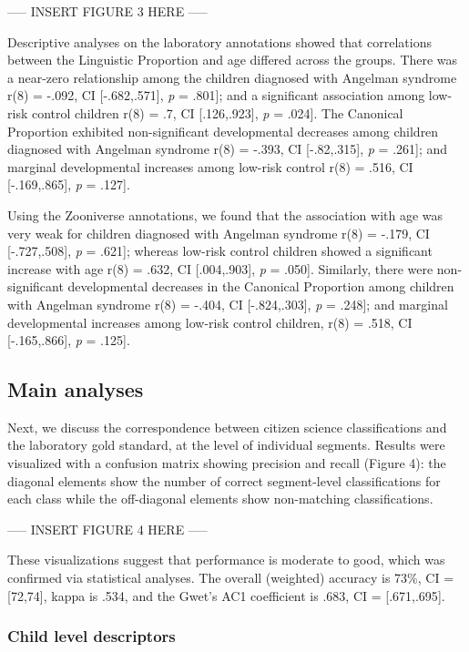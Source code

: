 \documentclass[english,,man]{apa6}
\begin{document}
----- INSERT FIGURE 3 HERE -----

Descriptive analyses on the laboratory annotations showed that correlations between the Linguistic Proportion and age differed across the groups. There was a near-zero relationship among the children diagnosed with Angelman syndrome r(8) = -.092, CI {[}-.682,.571{]}, \emph{p} = .801{]}; and a significant association among low-risk control children r(8) = .7, CI {[}.126,.923{]}, \emph{p} = .024{]}. The Canonical Proportion exhibited non-significant developmental decreases among children diagnosed with Angelman syndrome r(8) = -.393, CI {[}-.82,.315{]}, \emph{p} = .261{]}; and marginal developmental increases among low-risk control r(8) = .516, CI {[}-.169,.865{]}, \emph{p} = .127{]}.

Using the Zooniverse annotations, we found that the association with age was very weak for children diagnosed with Angelman syndrome r(8) = -.179, CI {[}-.727,.508{]}, \emph{p} = .621{]}; whereas low-risk control children showed a significant increase with age r(8) = .632, CI {[}.004,.903{]}, \emph{p} = .050{]}. Similarly, there were non-significant developmental decreases in the Canonical Proportion among children with Angelman syndrome r(8) = -.404, CI {[}-.824,.303{]}, \emph{p} = .248{]}; and marginal developmental increases among low-risk control children, r(8) = .518, CI {[}-.165,.866{]}, \emph{p} = .125{]}.

\hypertarget{main-analyses}{%
\subsection{Main analyses}\label{main-analyses}}

Next, we discuss the correspondence between citizen science classifications and the laboratory gold standard, at the level of individual segments. Results were visualized with a confusion matrix showing precision and recall (Figure 4): the diagonal elements show the number of correct segment-level classifications for each class while the off-diagonal elements show non-matching classifications.

----- INSERT FIGURE 4 HERE -----

These visualizations suggest that performance is moderate to good, which was confirmed via statistical analyses. The overall (weighted) accuracy is 73\%, CI = {[}72,74{]}, kappa is .534, and the Gwet's AC1 coefficient is .683, CI = {[}.671,.695{]}.

\hypertarget{child-level-descriptors}{%
\subsubsection{Child level descriptors}\label{child-level-descriptors}}
\end{document}
